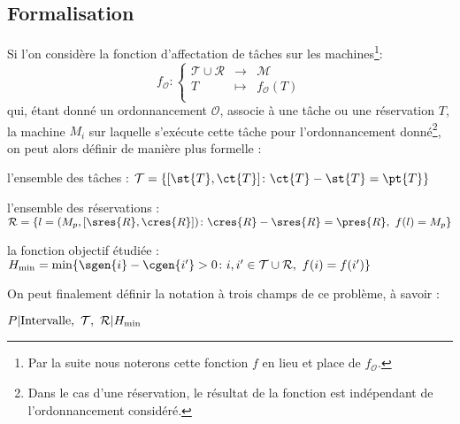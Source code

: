 \subsection{Formalisation}
    Si l'on considère la fonction d'affectation de tâches sur les machines\footnote{Par la suite
    nous noterons cette fonction $f$ en lieu et place de $f_{\mathcal{O}}$.}: \[
        f_{\mathcal{O}} : \left \lbrace \begin{array}{rcl}
            \mathcal{T} \cup \mathcal{R} & \longrightarrow & \mathcal{M} \\
            T & \mapsto & f_{\mathcal{O}}(T) \\
        \end{array}
        \right .
    \]
    qui, étant donné un ordonnancement $\mathcal{O}$, associe à une tâche ou une réservation $T$, la
    machine $M_i$ sur laquelle s'exécute cette tâche pour l'ordonnancement donné\footnote{Dans le
    cas d'une réservation, le résultat de la fonction est indépendant de l'ordonnancement
    considéré.}, on peut alors définir de manière plus formelle : \begin{bitemize}
        \item l'ensemble des tâches : \hfill $ \mathcal{T} = \{[\st{T}, \ct{T}]   \colon  
            \ct{T} - \st{T} = \pt{T} \} $
        \item l'ensemble des réservations : \hfill $\mathcal{R} = \{l = (M_p, [\sres{R}, \cres{R}])  
            \colon   \cres{R} - \sres{R} = \pres{R},\ f(l) = M_p\}$
        \item la fonction objectif étudiée : \hfill $H_{\min} = \min \{ \sgen{i} - \cgen{i'} > 0  
            \colon   i,i' \in \mathcal{T} \cup \mathcal{R},\ f(i) = f(i')\}$
    \end{bitemize}

    On peut finalement définir la notation à trois champs de ce problème, à savoir : 
    \begin{center}
        $P \arrowvert \mbox{Intervalle},\ \mathcal{T},\ \mathcal{R} \arrowvert H_{\min}$
    \end{center}
    

